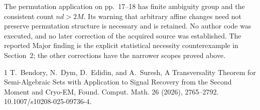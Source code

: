 \documentclass[10pt]{article}
\begin{document}
The permutation application on pp. 17–18 has finite ambiguity group and the consistent count \(nd>2M\). Its warning that arbitrary affine changes need not preserve permutation structure is necessary and is retained. No author code was executed, and no later correction of the acquired source was established. The reported Major finding is the explicit statistical necessity counterexample in Section 2; the other corrections have the narrower scopes proved above.\par
1 T. Bendory, N. Dym, D. Edidin, and A. Suresh, A Transversality Theorem for Semi-Algebraic Sets with Application to Signal Recovery from the Second Moment and Cryo-EM, Found. Comput. Math. 26 (2026), 2765–2792. 10.1007/s10208-025-09736-4.\par
\end{document}
